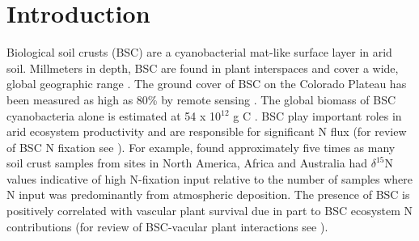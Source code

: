 \section{Introduction}


Biological soil crusts (BSC) are a cyanobacterial mat-like surface layer in arid soil. Millmeters in depth, BSC are found in plant interspaces and cover a wide, global geographic range \cite{garcia2003estimates}. The ground cover of BSC on the Colorado Plateau has been measured as high as 80\% by remote sensing \cite{karnieli2001}. The global biomass of BSC cyanobacteria alone is estimated at 54 x 10$^{12}$ g C \cite{garcia2003estimates}. BSC play important roles in arid ecosystem productivity and are responsible for significant N flux (for review of BSC N fixation see \citet{belnap2003}). For example, \citet{Evans_1999} found approximately five times as many soil crust samples from sites in North America, Africa and Australia had $\delta^{15}$N values indicative of high N-fixation input relative to the number of samples where N input was predominantly from atmospheric deposition. The presence of BSC is positively correlated with vascular plant survival due in part to BSC ecosystem N contributions (for review of BSC-vacular plant interactions see \citet{BelnapVascular}).

